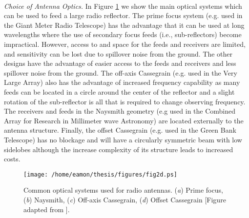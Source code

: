 \\
\textit{Choice of Antenna Optics.} In Figure \ref{fig2.2} we show the main optical systems which can be used to feed a large radio reflector. The prime focus system (e.g. used in the Giant Meter Radio Telescope) has the advantage that it can be used at long wavelengths where the use of secondary focus feeds (i.e., sub-reflectors) become impractical. However, access to and space for the feeds and receivers are limited, and sensitivity can be lost due to spillover noise from the ground. The other designs have the advantage of easier access to the feeds and receivers and less spillover noise from the ground. The off-axis Cassegrain (e.g. used in the Very Large Array) also has the advantage of increased frequency capability as many feeds can be located in a circle around the center of the reflector and a slight rotation of the sub-reflector is all that is required to change observing frequency. The receivers and feeds in the Naysmith geometry (e.g used in the Combined Array for Research in Millimeter wave Astronomy) are located externally to the antenna structure. Finally, the offset Cassegrain (e.g. used in the Green Bank Telescope) has no blockage and will have a circularly symmetric beam with low sidelobes although the increase complexity of its structure leads to increased costs. 

\begin{figure}[hbt!]
\centering 
          \texttt{[image: /home/eamon/thesis/figures/fig2d.ps]}
\caption[Common optical systems used for radio antennas.]{Common optical systems used for radio antennas. (\textit{a}) Prime focus, (\textit{b}) Naysmith, (\textit{c}) Off-axis Cassegrain, (\textit{d}) Offset Cassegrain [Figure adapted from \cite{taylor_1999}].}
\label{fig2.2}
\end{figure}

